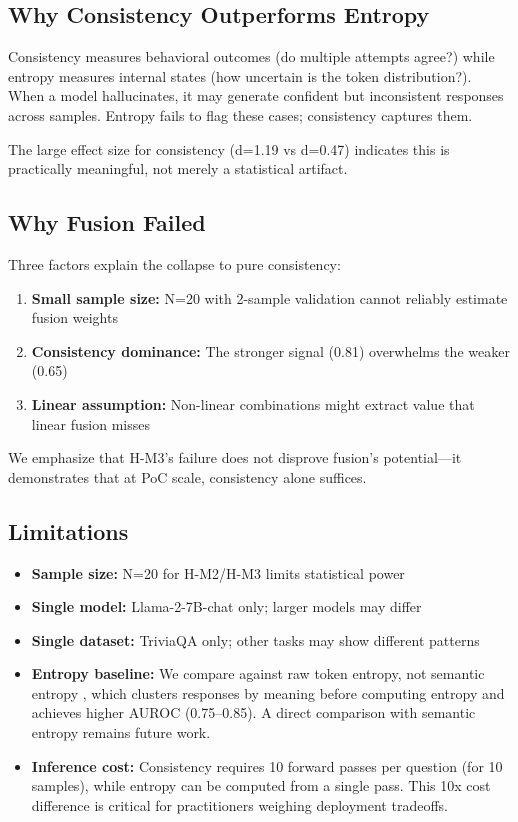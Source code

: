 \subsection{Why Consistency Outperforms Entropy}

Consistency measures behavioral outcomes (do multiple attempts agree?) while entropy measures internal states (how uncertain is the token distribution?). When a model hallucinates, it may generate confident but inconsistent responses across samples. Entropy fails to flag these cases; consistency captures them.

The large effect size for consistency (d=1.19 vs d=0.47) indicates this is practically meaningful, not merely a statistical artifact.

\subsection{Why Fusion Failed}

Three factors explain the collapse to pure consistency:

\begin{enumerate}
    \item \textbf{Small sample size:} N=20 with 2-sample validation cannot reliably estimate fusion weights
    \item \textbf{Consistency dominance:} The stronger signal (0.81) overwhelms the weaker (0.65)
    \item \textbf{Linear assumption:} Non-linear combinations might extract value that linear fusion misses
\end{enumerate}

We emphasize that H-M3's failure does not disprove fusion's potential---it demonstrates that at PoC scale, consistency alone suffices.

\subsection{Limitations}

\begin{itemize}
    \item \textbf{Sample size:} N=20 for H-M2/H-M3 limits statistical power
    \item \textbf{Single model:} Llama-2-7B-chat only; larger models may differ
    \item \textbf{Single dataset:} TriviaQA only; other tasks may show different patterns
    \item \textbf{Entropy baseline:} We compare against raw token entropy, not semantic entropy \citep{kuhn2023semantic}, which clusters responses by meaning before computing entropy and achieves higher AUROC (0.75--0.85). A direct comparison with semantic entropy remains future work.
    \item \textbf{Inference cost:} Consistency requires 10 forward passes per question (for 10 samples), while entropy can be computed from a single pass. This 10x cost difference is critical for practitioners weighing deployment tradeoffs.
\end{itemize}

